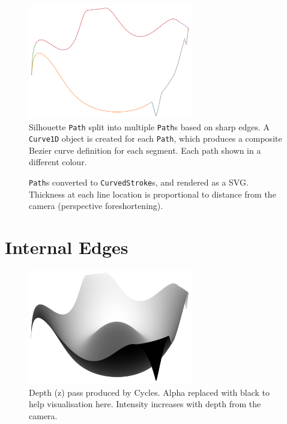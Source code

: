 \begin{figure}[h!]
	\centering
	\includegraphics[height=5cm]{images/sil_split_paths.png}
	\caption{Silhouette \texttt{Path} split into multiple \texttt{Path}s based on sharp edges. A \texttt{Curve1D} object is created for each \texttt{Path}, which produces a composite Bezier curve definition for each segment. Each path shown in a different colour.}\label{sil_split_paths}
\end{figure}

\begin{figure}[h!]
	\centering
	
	\caption{\texttt{Path}s converted to \texttt{CurvedStroke}s, and rendered as a SVG. Thickness at each line location is proportional to distance from the camera (perspective foreshortening).}\label{sil_obj}
\end{figure}

\newpage

\FloatBarrier
\section{Internal Edges}\label{impl_internal}
\begin{figure}[h!]
	\centering
	\includegraphics[height=5cm]{images/int_depth.png}
	\caption{Depth (z) pass produced by Cycles. Alpha replaced with black to help visualisation here. Intensity increases with depth from the camera.}\label{int_depth}
\end{figure}

